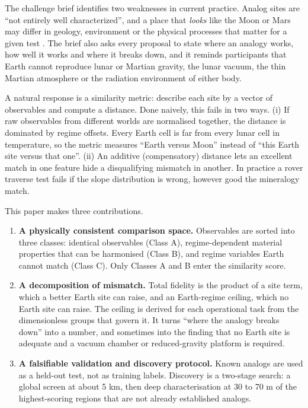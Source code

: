 \documentclass[11pt,a4paper]{article}
\begin{document}
The challenge brief identifies two weaknesses in current practice. Analog sites are ``not entirely well characterized'', and a place that \emph{looks} like the Moon or Mars may differ in geology, environment or the physical processes that matter for a given test \citep{spaceapps2026}. The brief also asks every proposal to state where an analogy works, how well it works and where it breaks down, and it reminds participants that Earth cannot reproduce lunar or Martian gravity, the lunar vacuum, the thin Martian atmosphere or the radiation environment of either body.

A natural response is a similarity metric: describe each site by a vector of observables and compute a distance. Done naively, this fails in two ways. (i) If raw observables from different worlds are normalised together, the distance is dominated by regime offsets. Every Earth cell is far from every lunar cell in temperature, so the metric measures ``Earth versus Moon'' instead of ``this Earth site versus that one''. (ii) An additive (compensatory) distance lets an excellent match in one feature hide a disqualifying mismatch in another. In practice a rover traverse test fails if the slope distribution is wrong, however good the mineralogy match.

This paper makes three contributions.
\begin{enumerate}
\item \textbf{A physically consistent comparison space.} Observables are sorted into three classes: identical observables (Class A), regime-dependent material properties that can be harmonised (Class B), and regime variables Earth cannot match (Class C). Only Classes A and B enter the similarity score.
\item \textbf{A decomposition of mismatch.} Total fidelity is the product of a site term, which a better Earth site can raise, and an Earth-regime ceiling, which no Earth site can raise. The ceiling is derived for each operational task from the dimensionless groups that govern it. It turns ``where the analogy breaks down'' into a number, and sometimes into the finding that no Earth site is adequate and a vacuum chamber or reduced-gravity platform is required.
\item \textbf{A falsifiable validation and discovery protocol.} Known analogs are used as a held-out test, not as training labels. Discovery is a two-stage search: a global screen at about 5 km, then deep characterisation at 30 to 70 m of the highest-scoring regions that are not already established analogs.
\end{enumerate}
\end{document}
